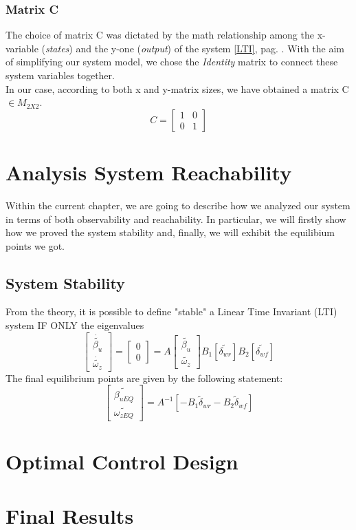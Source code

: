 \documentclass[a4paper,12pt,titlepage]{report}
\begin{document}
	\subsection{Matrix C}
	The choice of matrix C was dictated by the math relationship among the x-variable (\textit{states}) and the y-one (\textit{output}) of the system \ref{LTI}, pag. \pageref{LTI}. With the aim of simplifying our system model, we chose the \textit{Identity} matrix to connect these system variables together. \\ In our case, according to both x and y-matrix sizes, we have obtained a matrix C $\in M_{2X2}$.
		\begin{equation}
		C = 
		\begin{bmatrix}
			1 & 0 \\
			0 & 1
		\end{bmatrix}
		\end{equation}
		
\chapter{Analysis System Reachability}
	Within the current chapter, we are going to describe how we analyzed our system in terms of both observability and reachability. In particular, we will firstly show how we proved the system stability and, finally, we will exhibit the equilibium points we got.
\section{System Stability} 
	From the theory, it is possible to define "stable" a Linear Time Invariant (LTI) system IF ONLY the eigenvalues 
		\begin{equation}
			\begin{bmatrix}
				\dot{\tilde{\beta_{u}}} \\
				\dot{\tilde{\omega_{z}}}
			\end{bmatrix} =
			\begin{bmatrix}
				0 \\
				0
			\end{bmatrix} = A
			\begin{bmatrix}
				\tilde{\beta_{u}} \\
				\tilde{\omega_{z}}
			\end{bmatrix} 
			B_{1}[\tilde{\delta_{wr}}] B_{2}[\tilde{\delta_{wf}}]
		\end{equation}
	The final equilibrium points are given by the following statement:
		\begin{equation}
			\begin{bmatrix}
				\tilde{\beta_{uEQ}} \\
				\tilde{\omega_{zEQ}}
			\end{bmatrix} = 
			A^{-1}[-B_{1} \tilde\delta_{wr} - B_{2} \tilde\delta_{wf}]
		\end{equation}
\chapter{Optimal Control Design}

\chapter{Final Results}
\end{document}
